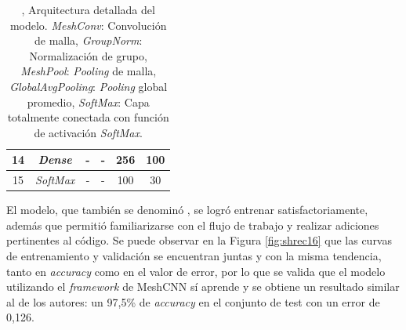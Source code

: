 \begin{table}[h]
{\begin{tabular}{|c|c|cc|cc|}
14 & \textit{Dense} & \multicolumn{1}{c|}{-} & - & \multicolumn{1}{c|}{256} & 100 \\ \hline
15 & \textit{SoftMax} & \multicolumn{1}{c|}{-} & - & \multicolumn{1}{c|}{100} & 30 \\ \hline
\end{tabular}%
}
\caption[SHREC16: Arquitectura detallada]{, Arquitectura detallada del modelo. \textit{MeshConv}: Convolución de malla, \textit{GroupNorm}: Normalización de grupo, \textit{MeshPool}: \textit{Pooling} de malla, \textit{GlobalAvgPooling}: \textit{Pooling} global promedio, \textit{SoftMax}: Capa totalmente conectada con función de activación \textit{SoftMax}.}
\label{table:SHREC16_detailArch}
\end{table}



El modelo, que también se denominó , se logró entrenar satisfactoriamente, además que permitió familiarizarse con el flujo de trabajo y realizar adiciones pertinentes al código. Se puede observar en la Figura \ref{fig:shrec16} que las curvas de entrenamiento y validación se encuentran juntas y con la misma tendencia, tanto en \textit{accuracy} como en el valor de error, por lo que se valida que el modelo utilizando el \textit{framework} de MeshCNN sí aprende y se obtiene un resultado similar al de los autores: un 97,5\% de \textit{accuracy} en el conjunto de test con un error de 0,126.


